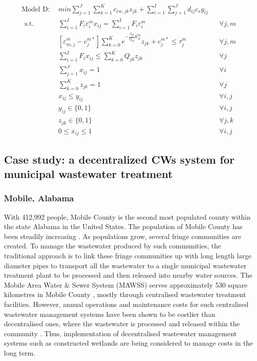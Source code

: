 \documentclass[preprint,12pt,authoryear]{elsarticle}
\begin{document}
\begin{equation*}\label{modelD}
\begin{aligned}
	\text{Model D}:~~&min \sum_{j=1}^{J}\sum_{k=1}^{K}c_{cw,jk}z_{jk}+\sum_{i=1}^{I}\sum_{j=1}^{J}d_{ij}c_sy_{ij}\\~~\mbox{s.t.}~~
	&{\sum_{i=1}^{I}F_{i}\varepsilon_{i}^{m}x_{ij}} = {\sum_{i=1}^{I}F_{i}\varepsilon_{i}^{m}}&&\forall j,m\\
	&[\varepsilon_{in,j}^{m}-{c}_{j}^{m*}]\sum_{k=0}^{K}e^{-\frac{A_{jk}}{Q_{jk}}k_{A}^{m}}z_{jk}+c_{j}^{m*} \leq \tau_{j}^{m}&&\forall j,m\\
	&\sum_{i=1}^{I}F_{i}x_{ij}\leq\sum_{k = 0}^{K}Q_{jk}z_{jk}&&\forall j\\
	&\sum_{j=1}^{J}x_{ij} = 1&&\forall i\\
	&\sum_{k=0}^{K}z_{jk} = 1&&\forall j\\
	&x_{ij}\leq y_{ij}&&\forall i,j\\
	&y_{ij} \in \{0,1\}&&\forall i,j\\
	&z_{jk} \in \{0,1\}&&\forall j,k\\
	&0 \leq x_{ij} \leq 1&&\forall i,j
\end{aligned}
\end{equation*}
\newpage
\subsection{Case study: a decentralized CWs system for municipal wastewater treatment}
\subsubsection{Mobile, Alabama}
With 412,992 people, Mobile County is the second most populated county within the state Alabama in the United States. The population of Mobile County has been steadily increasing \citep{uscb2002census}. As populations grow, several fringe communities are created. To manage the wastewater produced by such communities, the traditional approach is to link these fringe communities up with long length large diameter pipes to transport all the wastewater to a single municipal wastewater treatment plant to be processed and then released into nearby water sources. The Mobile Area Water \& Sewer System (MAWSS) serves approximately 530 square kilometres in Mobile County \citep{mawss2015}, mostly through centralised wastewater treatment facilities. However, annual operations and maintenance costs for such centralised wastewater management systems have been shown to be costlier than decentralised ones, where the wastewater is processed and released within the community \citep{mawss2015}. Thus, implementation of decentralised wastewater management systems such as constructed wetlands are being considered to manage costs in the long term. 
\end{document}
